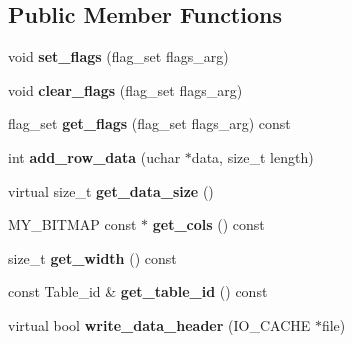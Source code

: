 \subsection*{Public Member Functions}
\begin{DoxyCompactItemize}
\item 
\mbox{\label{classOld__rows__log__event_ac6be59014a8e42c3dcaffa5e025ef849}} 
void {\bfseries set\+\_\+flags} (flag\+\_\+set flags\+\_\+arg)
\item 
\mbox{\label{classOld__rows__log__event_a0f9d55254a2ae2a60199c91d76a171a5}} 
void {\bfseries clear\+\_\+flags} (flag\+\_\+set flags\+\_\+arg)
\item 
\mbox{\label{classOld__rows__log__event_a9f2540d6852ff39a351d710124e8b28c}} 
flag\+\_\+set {\bfseries get\+\_\+flags} (flag\+\_\+set flags\+\_\+arg) const
\item 
\mbox{\label{classOld__rows__log__event_a1568d0454cbe8ee123410538262a4e61}} 
int {\bfseries add\+\_\+row\+\_\+data} (uchar $\ast$data, size\+\_\+t length)
\item 
\mbox{\label{classOld__rows__log__event_ab7ca741d255e7facaa0f769d4e2bd893}} 
virtual size\+\_\+t {\bfseries get\+\_\+data\+\_\+size} ()
\item 
\mbox{\label{classOld__rows__log__event_a4c6033dc8d6eee3e31f5bc0fbda80fa4}} 
M\+Y\+\_\+\+B\+I\+T\+M\+AP const  $\ast$ {\bfseries get\+\_\+cols} () const
\item 
\mbox{\label{classOld__rows__log__event_a3c4841b4e80c43d5d0c67146ac34a382}} 
size\+\_\+t {\bfseries get\+\_\+width} () const
\item 
\mbox{\label{classOld__rows__log__event_a61d44e6702bd8a14fd0cf91f0e26d20d}} 
const Table\+\_\+id \& {\bfseries get\+\_\+table\+\_\+id} () const
\item 
\mbox{\label{classOld__rows__log__event_a64894100f50979b6c20892acb7595493}} 
virtual bool {\bfseries write\+\_\+data\+\_\+header} (I\+O\+\_\+\+C\+A\+C\+HE $\ast$file)

\end{DoxyCompactItemize}
